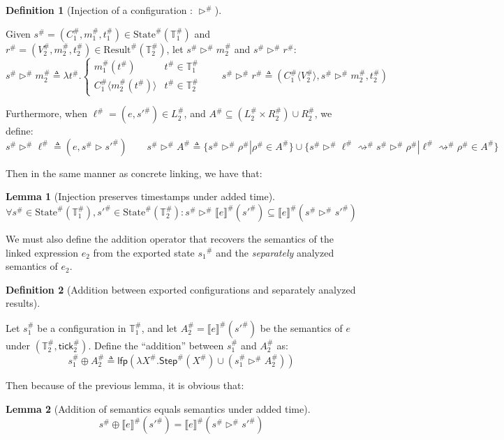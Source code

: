 \documentclass[acmsmall,review]{acmart}\settopmatter{printfolios=true,printccs=false,printacmref=false}
\theoremstyle{definition}
\newtheorem{definition}{Definition}[section]
\newtheorem{lem}{Lemma}[section]
\newcommand*{\A}[1]{{#1}^{\#}}
\newcommand*{\Time}{\mathbb{T}}
\newcommand*{\ATime}{\A{\Time}}
\newcommand*{\mem}{m}
\newcommand*{\AState}[1]{\A{\text{State}}({#1})}
\newcommand*{\AResult}[1]{\A{\text{Result}}({#1})}
\newcommand*{\sembracket}[1]{\lBrack{#1}\rBrack}
\newcommand*{\tick}{\mathsf{tick}}
\newcommand*{\inject}[2]{{#1}\langle{#2}\rangle}
\begin{document}
\begin{definition}[Injection of a configuration : $\A\rhd$]
  $\:$

  Given $\A{s}=(\A{C}_1,\A{\mem}_1,\A{t}_1)\in\AState{\ATime_1}$ and $\A{r}=(\A{V}_2,\A{\mem}_2,\A{t}_2)\in\AResult{\ATime_2}$,
  let $\A{s}\A\rhd \A{\mem}_2$ and $\A{s}\A\rhd \A{r}$:
  \[
    \A{s}\A\rhd\A{\mem}_2\triangleq
    \lambda \A{t}.
    \begin{cases}
      \A{\mem}_1(\A{t})                   & \A{t}\in\ATime_1 \\
      \inject{\A{C}_1}{\A{\mem}_2(\A{t})} & \A{t}\in\ATime_2
    \end{cases}
    \qquad
    \A{s}\A\rhd \A{r}\triangleq
    (\inject{\A{C}_1}{\A{V}_2},\A{s}\A\rhd \A{\mem}_2,\A{t}_2)
  \]

  Furthermore, when $\A\ell=(e,\A{s'})\in \A{L}_2$, and $\A{A}\subseteq (\A{L}_2\times \A{R}_2)\cup \A{R}_2$, we define:
  \[
    \A{s}\A\rhd\A\ell\triangleq(e,\A{s}\rhd \A{s'})\qquad
    \A{s}\A\rhd\A{A}\triangleq\{\A{s}\A\rhd\A\rho|\A\rho\in \A{A}\}\cup\{\A{s}\A\rhd\A\ell\A\rightsquigarrow \A{s}\A\rhd\A\rho|\A\ell\A\rightsquigarrow\A\rho\in \A{A}\}
  \]
\end{definition}

Then in the same manner as concrete linking, we have that:

\begin{lem}[Injection preserves timestamps under added time]
  \[
    \forall \A{s}\in\AState{\ATime_1},\A{s'}\in\AState{\ATime_2}:\A{s}\A\rhd{\A{\sembracket{e}}}(\A{s'})\subseteq\A{\sembracket{e}}(\A{s}\A\rhd\A{s'})
  \]
\end{lem}

We must also define the addition operator that recovers the semantics of the linked expression $e_2$ from the exported state $\A{s_1}$ and the \emph{separately} analyzed semantics of $e_2$.

\begin{definition}[Addition between exported configurations and separately analyzed results]
  $\:$

  Let $\A{s}_1$ be a configuration in $\ATime_1$, and let $\A{A}_2=\A{\sembracket{e}}(\A{s'})$ be the semantics of $e$ under $(\ATime_2,\A\tick_2)$.
  Define the ``addition'' between $\A{s}_1$ and $\A{A}_2$ as:
  \[
    \A{s}_1\oplus\A{A}_2\triangleq\mathsf{lfp}(\lambda\A{X}.\A{\mathsf{Step}}(\A{X})\cup(\A{s}_1\A\rhd\A{A}_2))
  \]
\end{definition}

Then because of the previous lemma, it is obvious that:
\begin{lem}[Addition of semantics equals semantics under added time]
  \[
    \A{s}\oplus\A{\sembracket{e}}(\A{s'}) = \A{\sembracket{e}}(\A{s}\A\rhd\A{s'})
  \]
\end{lem}
\end{document}
